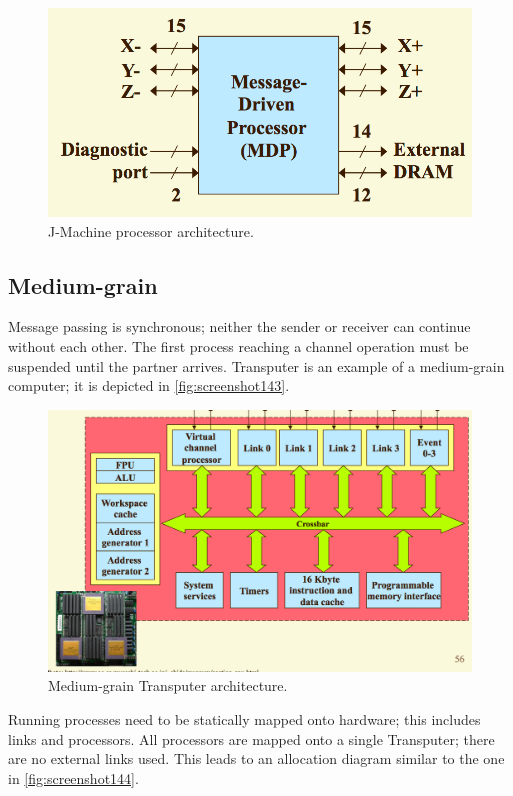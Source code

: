 \begin{figure}
\centering
\includegraphics[width=0.7\linewidth]{screenshot142}
\caption{J-Machine processor architecture.}
\label{fig:screenshot142}
\end{figure}

\subsection{Medium-grain}
Message passing is synchronous; neither the sender or receiver can continue without each other. The first process reaching a channel operation must be suspended until the partner arrives. Transputer is an example of a medium-grain computer; it is depicted in \autoref{fig:screenshot143}.

\begin{figure}
\centering
\includegraphics[width=0.7\linewidth]{screenshot143}
\caption{Medium-grain Transputer architecture.}
\label{fig:screenshot143}
\end{figure}

Running processes need to be statically mapped onto hardware; this includes links and processors. All processors are mapped onto a single Transputer; there are no external links used. This leads to an allocation diagram similar to the one in \autoref{fig:screenshot144}.

